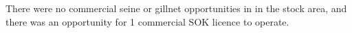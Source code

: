 There were no commercial seine or gillnet opportunities in \thisYr{} in the \regionName{} \regionType{} stock area, and there was an opportunity for 1 commercial SOK licence to operate.